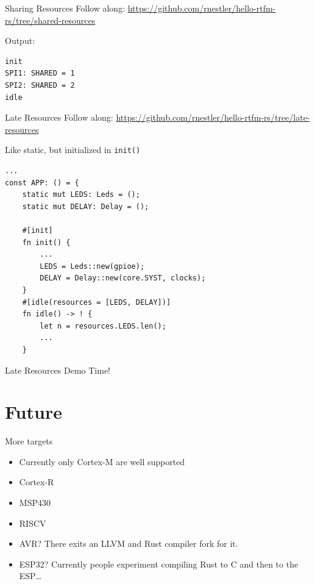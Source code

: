 \documentclass[aspectratio=1610,14pt,t]{beamer}
\begin{document}
\begin{frame}[c,fragile]{Sharing Resources}
  \small{Follow along: \url{https://github.com/rnestler/hello-rtfm-rs/tree/shared-resources}}

  Output:
  \begin{verbatim}
init
SPI1: SHARED = 1
SPI2: SHARED = 2
idle
  \end{verbatim}
\end{frame}

\begin{frame}[c,fragile]{Late Resources}
  \small{Follow along: \url{https://github.com/rnestler/hello-rtfm-rs/tree/late-resources}}

  Like static, but initialized in \texttt{init()}

  \begin{verbatim}
...
const APP: () = {
    static mut LEDS: Leds = ();
    static mut DELAY: Delay = ();

    #[init]
    fn init() {
        ...
        LEDS = Leds::new(gpioe);
        DELAY = Delay::new(core.SYST, clocks);
    }
    #[idle(resources = [LEDS, DELAY])]
    fn idle() -> ! {
        let n = resources.LEDS.len();
        ...
    }
  \end{verbatim}
\end{frame}

\begin{frame}[c,fragile]{Late Resources}
  Demo Time!
\end{frame}

\section{Future}

\begin{frame}[c]{More targets}
  \begin{itemize}
    \item Currently only Cortex-M are well supported
    \item Cortex-R
    \item MSP430
    \item RISCV
    \item<2-> AVR? There exits an LLVM and Rust compiler fork for it.
    \item<2-> ESP32? Currently people experiment compiling Rust to C and then
      to the ESP\ldots
  \end{itemize}
\end{frame}
\end{document}
